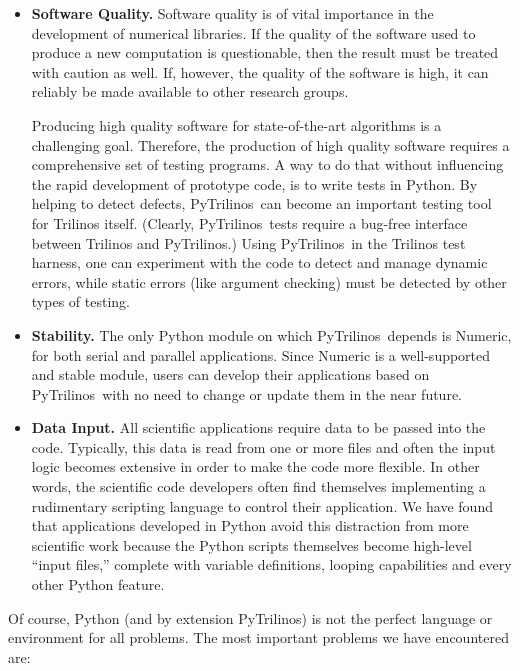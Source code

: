 \documentclass[acmtocl]{acmtrans2m}
\newcommand{\PyTrilinos}{{PyTrilinos}}
\begin{document}
\begin{itemize}
\item {\bf Software Quality.} Software quality is of vital importance
  in the development of numerical libraries.  If the quality of the
  software used to produce a new computation is questionable, then the
  result must be treated with caution as well.  If, however, the
  quality of the software is high, it can reliably be made available
  to other research groups.

  Producing high quality software for state-of-the-art algorithms is a
  challenging goal.  Therefore, the production of high quality
  software requires a comprehensive set of testing programs.  A way to
  do that without influencing the rapid development of prototype code,
  is to write tests in Python.  By helping to detect defects,
  \PyTrilinos\ can become an important testing tool for Trilinos itself.
  (Clearly, \PyTrilinos\ tests require a bug-free interface between
  Trilinos and \PyTrilinos.) Using \PyTrilinos\ in the Trilinos test
  harness, one can experiment with the code to detect and manage
  dynamic errors, while static errors (like argument checking) must be
  detected by other types of testing.

\item {\bf Stability.} The only Python module on which
  \PyTrilinos\ depends is Numeric, for both serial and parallel
  applications.  Since Numeric is a well-supported and stable module,
  users can develop their applications based on \PyTrilinos\ with no
  need to change or update them in the near future.

\item {\bf Data Input.} All scientific applications require data to be
  passed into the code.  Typically, this data is read from one or more
  files and often the input logic becomes extensive in order to make
  the code more flexible.  In other words, the scientific code
  developers often find themselves implementing a rudimentary
  scripting language to control their application.  We have found that
  applications developed in Python avoid this distraction from more
  scientific work because the Python scripts themselves become
  high-level ``input files,'' complete with variable definitions,
  looping capabilities and every other Python feature.

\end{itemize}

\smallskip

Of course, Python (and by extension \PyTrilinos) is not the perfect
language or environment for all problems.  The most important problems
we have encountered are:
\end{document}
